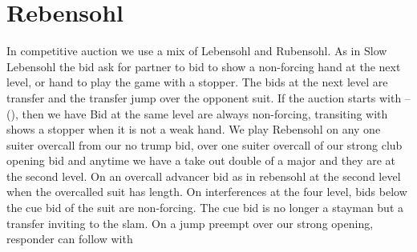 \section{Rebensohl}
In competitive auction we use a mix of Lebensohl and Rubensohl. As in Slow Lebensohl the \bid{2\NT} bid ask for partner to bid \bid{3\CS} to show a non-forcing hand at the next level, or hand to play the game with a stopper. The bids at the next level are transfer and the transfer jump over the opponent suit. If the auction starts with \bid{1\NT}–(\bid{2\SpS}), then we have
Bid at the same level are always non-forcing, transiting with \bid{2\NT} shows a stopper when it is not a weak hand. We play Rebensohl on any one suiter overcall from our no trump bid, over one suiter overcall of our strong club opening bid and anytime we have a take out double of a major and they are at the second level. On an \bid{1\NT} overcall advancer bid as in rebensohl at the second level when the overcalled suit has length.
On interferences at the four level, bids below the cue bid of the suit are non-forcing. The cue bid is no longer a stayman but a transfer inviting to the slam. On a jump preempt over our strong opening,
responder can follow with
